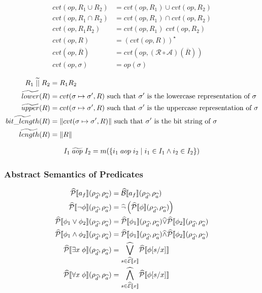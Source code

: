 \begin{align}
    cvt(op, R_1 \cup R_2) &= cvt(op, R_1) \cup cvt(op, R_2) \\
    cvt(op, R_1 \cap R_2) &= cvt(op, R_1) \cap cvt(op, R_2) \\
    cvt(op, R_1R_2) &= cvt(op, R_1) \; cvt(op, R_2) \\
    cvt(op, R) &= (cvt(op, R))^\star \\
    cvt(op, \overline{R}) &= cvt(op, (\mathcal{R} \circ \mathcal{A}) (\overline{R})) \\
    cvt(op, \sigma) &= op(\sigma)
\end{align}

\begin{align}
    R_1 \;\widetilde{||}\; R_2 &= R_1R_2 \\
    \widetilde{lower}(R) &= cvt(\sigma \mapsto \sigma', R) \text{ such that $\sigma'$ is the lowercase representation of $\sigma$}\\
    \widetilde{upper}(R) &= cvt(\sigma \mapsto \sigma', R) \text{ such that $\sigma'$ is the uppercase representation of $\sigma$}\\
    \widetilde{bit\_length}(R) &= \|cvt(\sigma \mapsto \sigma', R)\| \text{ such that $\sigma'$ is the bit string of $\sigma$} \\
    \widetilde{length}(R) &= \|R\|
\end{align}

\begin{align}
    I_1 \;\widetilde{aop}\; I_2 &= m(\{i_1 \; aop \; i_2 \mid i_1 \in I_1 \land i_2 \in I_2\}) \\
\end{align}

\subsubsection{Abstract Semantics of Predicates}

\begin{align}
    \widehat{\mathcal{P}}\llbracket a_f \rrbracket(\rho_{\widehat{d}}, \rho_{\widehat{a}}) &= \widehat{\mathcal{B}}\llbracket a_f \rrbracket(\rho_{\widehat{d}}, \rho_{\widehat{a}}) \\
    \widehat{\mathcal{P}}\llbracket \neg \phi \rrbracket(\rho_{\widehat{d}}, \rho_{\widehat{a}}) &= \widehat{\neg} \left( \widehat{\mathcal{P}}\llbracket \phi \rrbracket(\rho_{\widehat{d}}, \rho_{\widehat{a}}) \right) \\
    \widehat{\mathcal{P}}\llbracket \phi_1 \lor \phi_2 \rrbracket(\rho_{\widehat{d}}, \rho_{\widehat{a}}) &= \widehat{\mathcal{P}}\llbracket \phi_1 \rrbracket(\rho_{\widehat{d}}, \rho_{\widehat{a}}) \widehat{\lor} \widehat{\mathcal{P}}\llbracket \phi_2 \rrbracket(\rho_{\widehat{d}}, \rho_{\widehat{a}}) \\
    \widehat{\mathcal{P}}\llbracket \phi_1 \land \phi_2 \rrbracket(\rho_{\widehat{d}}, \rho_{\widehat{a}}) &= \widehat{\mathcal{P}}\llbracket \phi_1 \rrbracket(\rho_{\widehat{d}}, \rho_{\widehat{a}}) \widehat{\land} \widehat{\mathcal{P}}\llbracket \phi_2 \rrbracket(\rho_{\widehat{d}}, \rho_{\widehat{a}}) \\
    \widehat{\mathcal{P}}\llbracket \exists x \; \phi \rrbracket(\rho_{\widehat{d}}, \rho_{\widehat{a}}) &= \underset{s \in \widehat{\mathcal{E}}\llbracket x \rrbracket}{\widehat{\bigvee}} \widehat{\mathcal{P}}\llbracket \phi[s/x] \rrbracket \\
    \widehat{\mathcal{P}}\llbracket \forall x \; \phi \rrbracket(\rho_{\widehat{d}}, \rho_{\widehat{a}}) &= \underset{s \in \widehat{\mathcal{E}}\llbracket x \rrbracket}{\widehat{\bigwedge}} \widehat{\mathcal{P}}\llbracket \phi[s/x] \rrbracket
\end{align}

